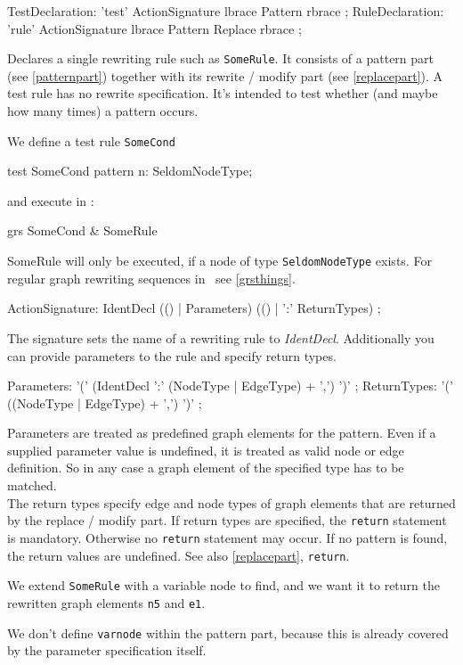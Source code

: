 \begin{rail}
  TestDeclaration: 'test' ActionSignature lbrace Pattern rbrace ;
  RuleDeclaration: 'rule' ActionSignature lbrace Pattern Replace rbrace ;
\end{rail}
Declares a single rewriting rule such as \texttt{SomeRule}. It consists of a pattern part (see \ref{patternpart}) together with its rewrite / modify part (see \ref{replacepart}). A test rule has no rewrite specification. It's intended to test whether (and maybe how many times) a pattern occurs.
\begin{example}
We define a test rule \texttt{SomeCond}
\begin{grgen}
test SomeCond {
  pattern {
    n: SeldomNodeType;
  }
}
\end{grgen}
and execute in \GrShell:
\begin{grshell}
  grs SomeCond & SomeRule
\end{grshell}
SomeRule will only be executed, if a node of type \texttt{SeldomNodeType} exists. For regular graph rewriting sequences in \GrShell\ see \ref{grsthings}.
\end{example}

\begin{rail}  
  ActionSignature: IdentDecl (() | Parameters) (() | ':' ReturnTypes) ;
\end{rail}
The signature sets the name of a rewriting rule to \emph{IdentDecl}. Additionally you can provide parameters to the rule and specify return types.

\begin{rail}
  Parameters: '(' (IdentDecl ':' (NodeType | EdgeType) + ',') ')' ;
  ReturnTypes: '(' ((NodeType | EdgeType) + ',') ')' ;
\end{rail}
Parameters are treated as predefined graph elements for the pattern. Even if a supplied parameter value is undefined, it is treated as valid node or edge definition. So in any case a graph element of the specified type has to be matched. \\
The return types specify edge and node types of graph elements that are returned by the replace / modify part. If return types are specified, the \texttt{return} statement is mandatory. Otherwise no \texttt{return} statement may occur. If no pattern is found, the return values are undefined. See also \ref{replacepart}, \texttt{return}.
\begin{example}
We extend \texttt{SomeRule} with a variable node to find, and we want it to return the rewritten graph elements \texttt{n5} and \texttt{e1}.
\begin{grgen}
  rule SomeRuleExt(varnode: Node): (Node, EdgeTypeB) {
    pattern{
      n1: NodeTypeA;
      ...
    }
    replace {
      varnode;
      ...  
      return(n5, e1);
      eval {
        ...
\end{grgen}
We don't define \texttt{varnode} within the pattern part, because this is already covered by the parameter specification itself.
\end{example}


